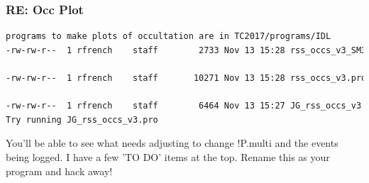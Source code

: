 \documentclass[crop=false,class=book]{standalone}
\begin{document}
\subsubsection{\footnotesize RE: Occ Plot}
\begin{lstlisting}[language=bash,basicstyle=\footnotesize]
programs to make plots of occultation are in TC2017/programs/IDL
-rw-rw-r--  1 rfrench    staff        2733 Nov 13 15:28 rss_occs_v3_SM3.ker

-rw-rw-r--  1 rfrench    staff       10271 Nov 13 15:28 rss_occs_v3.pro

-rw-rw-r--  1 rfrench    staff        6464 Nov 13 15:27 JG_rss_occs_v3.pro
Try running JG_rss_occs_v3.pro
\end{lstlisting}
You'll be able to see what needs adjusting to change !P.multi and the events being logged. I have a few 'TO DO' items at the top. Rename this as your program and hack away!
\end{document}
